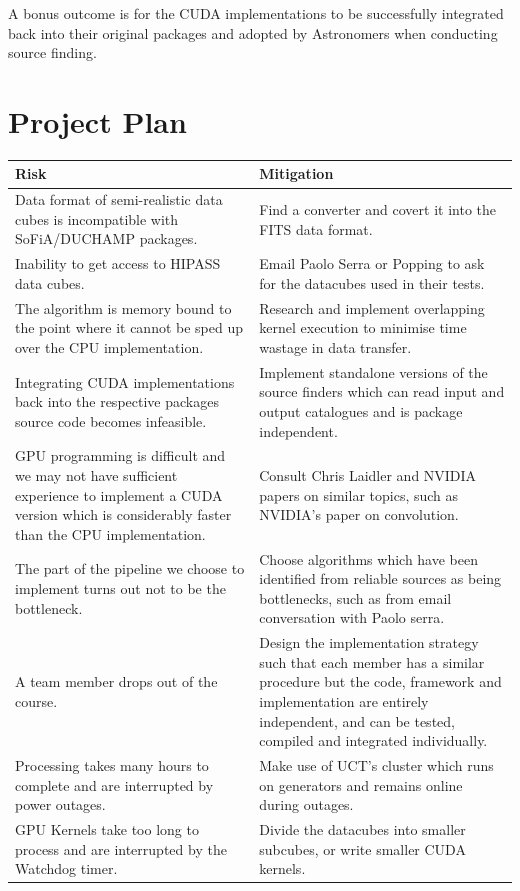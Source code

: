 \documentclass[prodmode,acmtecs]{acmsmall} \usepackage[ruled]{algorithm2e}
\begin{document}
A bonus outcome is for the CUDA implementations to be successfully integrated back into their original packages and adopted by Astronomers when conducting source finding.

\section{Project Plan}

\begin{table}
\begin{tabular}{| p{7cm} | p{7cm} |}
    \hline
        Risk & Mitigation \\
    \hline
        Data format of semi-realistic data cubes is incompatible with SoFiA/DUCHAMP packages. &
        Find a converter and covert it into the FITS data format. \\
    \hline
        Inability to get access to HIPASS data cubes. &
        Email Paolo Serra or Popping to ask for the datacubes used in their tests. \\
    \hline
        The algorithm is memory bound to the point where it cannot be sped up over the CPU implementation. &
        Research and implement overlapping kernel execution to minimise time wastage in data transfer. \\
    \hline
        Integrating CUDA implementations back into the respective packages source code becomes infeasible. &
        Implement standalone versions of the source finders which can read input and output catalogues and is package independent. \\
    \hline
        GPU programming is difficult and we may not have sufficient experience to implement a CUDA version which is considerably faster than the CPU implementation. &
        Consult Chris Laidler and NVIDIA papers on similar topics, such as NVIDIA’s paper on convolution. \\
    \hline
        The part of the pipeline we choose to implement turns out not to be the bottleneck. &
        Choose algorithms which have been identified from reliable sources as being bottlenecks, such as from email conversation with Paolo serra. \\
    \hline
        A team member drops out of the course. &
        Design the implementation strategy such that each member has a similar procedure but the code, framework and implementation are entirely independent, and can be tested, compiled and integrated individually. \\
    \hline
        Processing takes many hours to complete and are interrupted by power outages. &
        Make use of UCT’s cluster which runs on generators and remains online during outages. \\
    \hline
        GPU Kernels take too long to process and are interrupted by the Watchdog timer. &
        Divide the datacubes into smaller subcubes, or write smaller CUDA kernels. \\
    \hline
\end{tabular}
\end{table}
\end{document}
